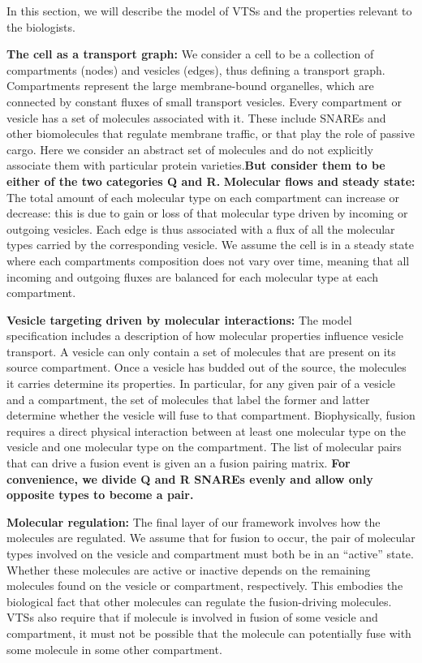 %
In this section, we will describe the model of VTSs and the properties
relevant to the biologists.

\textbf{The cell as a transport graph:} We consider a cell to be a
collection of compartments (nodes) and vesicles (edges), thus defining
a transport graph.
%
Compartments represent the large membrane-bound organelles, which are
connected by constant fluxes of small transport vesicles.
%
Every compartment or vesicle has a set of molecules associated with
it.
%
These include SNAREs and other biomolecules that regulate membrane
traffic, or that play the role of passive cargo.
%
Here we consider an abstract set of molecules and do
not explicitly associate them with particular protein varieties.\textbf{But consider them to be either of  
the two categories Q and R.}
\textbf{Molecular flows and steady state:} The total amount of each
molecular type on each compartment can increase or decrease: this is
due to gain or loss of that molecular type driven by incoming or
outgoing vesicles.
%
Each edge is thus associated with a flux of all the molecular types
carried by the corresponding vesicle.
%
We assume the cell is in a steady state where each compartments
composition does not vary over time, meaning that all incoming and
outgoing fluxes are balanced for each molecular type at each
compartment.

\textbf{Vesicle targeting driven by molecular interactions:} The model
specification includes a description of how molecular properties
influence vesicle transport.
%
A vesicle can only contain a set of molecules that are present
on its source compartment.
%
Once a vesicle has budded out of the source, the molecules it carries
determine its properties.
%
In particular, for any given pair of a vesicle and a compartment, the
set of molecules that label the former and latter determine whether
the vesicle will fuse to that compartment.
%
Biophysically, fusion requires a direct physical interaction between
at least one molecular type on the vesicle and one molecular type on
the compartment.
%
The list of molecular pairs that can drive a fusion event is given an
a fusion pairing matrix. \textbf{For convenience, we divide Q and R SNAREs evenly 
and allow only opposite types to become a pair.}

\textbf{Molecular regulation:} The final layer of our framework
involves how the molecules are regulated.
%
We assume that for fusion to occur, the pair of molecular types
involved on the vesicle and compartment must both be in an
“active” state.
%
Whether these molecules are active or inactive depends on the
remaining molecules found on the vesicle or compartment, respectively.
%
This embodies the biological fact that other molecules can regulate the
fusion-driving molecules.
%
VTSs also require that if molecule is involved in fusion of some
vesicle and compartment, it must not be possible that the molecule 
can potentially fuse with some molecule in some other compartment.
%

